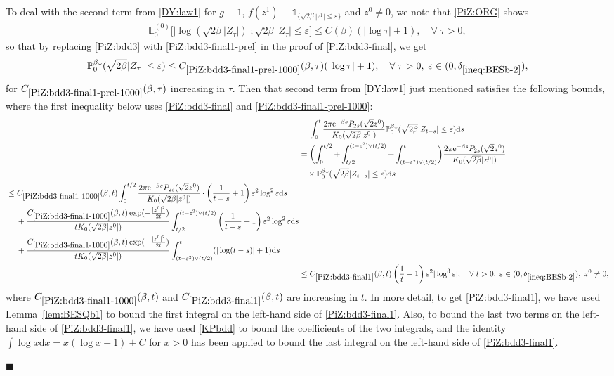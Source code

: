 \documentclass[12pt, twoside]{article}
\numberwithin{figure}{section}
\newcommand{\e}{{\mathrm e}}
\newcommand{\1}{\mathds 1}
\newcommand{\vep}{{\varepsilon}}
\newcommand{\da}{{\downarrow}}
\renewcommand{\P}{{\mathbb P}}
\newcommand{\E}{{\mathbb E}}
\renewcommand{\d}{{\mathrm d}}
\newcommand{\2}{{\mathbf 1}}
\renewenvironment{proof}[1][\proofname]{\noindent {\bfseries #1.}\;}{\hfill\ensuremath{\blacksquare}\\}
\newcommand{\two}{{\sqrt{2}}}
\newcommand{\deltaz}{\delta_{\ref{ineq:BESb-2}}}
\begin{document}
\begin{proof}[Proof of Lemma~\ref{lem:PiZbdd}]
To deal with the second term from \eqref{DY:law1} for $g\equiv 1$, $f(z^1)\equiv \1_{\{\sqrt{2\beta}|z^1|\leq \vep\}}$ and $z^0\neq 0$, we note that \eqref{PiZ:ORG} shows
\begin{align}\label{PiZ:bdd3-final1-prel}
\E^{(0)}_0\bigl[\bigl|\log (\sqrt{2\beta}|Z_\tau|)\bigr|;\sqrt{2\beta}|Z_\tau|\leq \vep\bigr]\leq C(\beta)(|\log\tau|+1),\quad \forall\;\tau>0,
\end{align}
so that by replacing \eqref{PiZ:bdd3} with \eqref{PiZ:bdd3-final1-prel} in the proof of \eqref{PiZ:bdd3-final}, we get
\begin{align}\label{PiZ:bdd3-final1-prel-1000}
 \P_{0}^{\beta\da}(\sqrt{2\beta}|Z_{\tau}|\leq \vep)\leq C_{\ref{PiZ:bdd3-final1-prel-1000}}(\beta,\tau)(|\log\tau|+1),\quad \forall\;\tau>0,\;\vep\in (0,\deltaz),
\end{align}
for $C_{\ref{PiZ:bdd3-final1-prel-1000}}(\beta,\tau)$ increasing in $\tau$.
Then that second term from \eqref{DY:law1} just mentioned satisfies the following bounds, where the first inequality below uses  \eqref{PiZ:bdd3-final} and \eqref{PiZ:bdd3-final1-prel-1000}:
\begin{align}
&\quad\;\int_0^t \frac{2\pi\e^{-\beta s}P_{2s}(\two z^0)}{K_0(\sqrt{2\beta}|z^0|)} \P_{0}^{\beta\da}(\sqrt{2\beta}|Z_{t-s}|\leq \vep)\d s\notag\\
&=\biggl(\int_0^{t/2}+\int_{t/2}^{(t-\vep^2)\vee (t/2)}+ \int_{(t-\vep^2)\vee (t/2)}^t\biggr) \frac{2\pi\e^{-\beta s}P_{2s}(\two z^0)}{K_0(\sqrt{2\beta}|z^0|)}\notag\\
&\quad \times\P_{0}^{\beta\da}(\sqrt{2\beta}|Z_{t-s}|\leq \vep)\d s\notag\\
\begin{split}
&\leq C_{\ref{PiZ:bdd3-final1-1000}}(\beta,t)\int_0^{t/2}\frac{2\pi \e^{-\beta s}P_{2s}(\two z^0)}{K_0(\sqrt{2\beta}|z^0|)}\cdot \left(\frac{1}{t-s}+1\right)\vep^2\log^2\vep \d s\\
&\quad \;+
\frac{C_{\ref{PiZ:bdd3-final1-1000}}(\beta,t)\exp(-\frac{|z^0|^2}{2t})}{tK_0(\sqrt{2\beta}|z^0|)}
\int_{t/2}^{(t-\vep^2)\vee (t/2)} \left(\frac{1}{t-s}+1\right)\vep^2\log^2\vep \d s\\
&\quad \;+\frac{C_{\ref{PiZ:bdd3-final1-1000}}(\beta,t)\exp(-\frac{|z^0|^2}{2t})}{tK_0(\sqrt{2\beta}|z^0|)} \int_{(t-\vep^2)\vee (t/2)}^t ( |\log(t-s)|+1)\d s \label{PiZ:bdd3-final1-1000}
\end{split}\\
&\leq C_{\ref{PiZ:bdd3-final1}}(\beta,t)\left(\frac{1}{t}+1\right)\vep^2|\log^3\vep|,\quad \forall\;t>0,\;\vep\in (0,\deltaz),\;z^0\neq 0,\label{PiZ:bdd3-final1}
\end{align}
where $C_{\ref{PiZ:bdd3-final1-1000}}(\beta,t)$ and $C_{\ref{PiZ:bdd3-final1}}(\beta,t)$ are increasing in $t$. In more detail, to get \eqref{PiZ:bdd3-final1}, we have used Lemma~\ref{lem:BESQb1} to bound the first integral on the left-hand side of \eqref{PiZ:bdd3-final1}. Also, to bound the last two terms on
the left-hand side of \eqref{PiZ:bdd3-final1},  we have used \eqref{KPbdd} to bound the coefficients of the two integrals,
and the identity $\int \log x\d x=x(\log x-1)+C$ for $x>0$ has been applied to bound the last integral on the left-hand side of \eqref{PiZ:bdd3-final1}. 


\end{proof}
\end{document}
